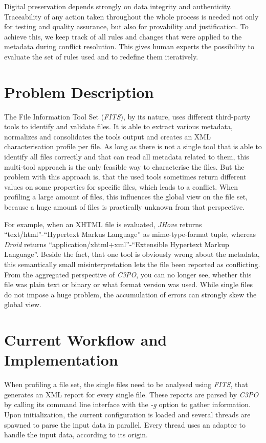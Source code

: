 \documentclass[a4paper,12pt]{article}
\begin{document}
Digital preservation depends strongly on data integrity and authenticity. Traceability of any action taken throughout the whole process is needed not only for testing and quality assurance, but also for provability and justification. To achieve this, we keep track of all rules and changes that were applied to the metadata during conflict resolution. This gives human experts the possibility to evaluate the set of rules used and to redefine them iteratively.


\section{Problem Description}

The File Information Tool Set (\emph{FITS}), by its nature, uses different third-party tools to identify and validate files. It is able to extract various metadata, normalizes and consolidates the tools output and creates an XML characterisation profile per file. As long as there is not a single tool that is able to identify all files correctly and that can read all metadata related to them, this multi-tool approach is the only feasible way to characterise the files. But the problem with this approach is, that the used tools sometimes return different values on some properties for specific files, which leads to a conflict. When profiling a large amount of files, this influences the global view on the file set, because a huge amount of files is practically unknown from that perspective.

For example, when an XHTML file is evaluated, \emph{JHove} returns ``text/html''-``Hypertext Markus Language'' as mime-type-format tuple, whereas \emph{Droid} returns ``application/xhtml+xml''-``Extensible Hypertext Markup Language''. Beside the fact, that one tool is obviously wrong about the metadata, this semantically small misinterpretation lets the file been reported as conflicting. From the aggregated perspective of \emph{C3PO}, you can no longer see, whether this file was plain text or binary or what format version was used. While single files do not impose a huge problem, the accumulation of errors can strongly skew the global view.


\section{Current Workflow and Implementation}
When profiling a file set, the single files need to be analysed using \emph{FITS}, that generates an XML report for every single file. These reports are parsed by \emph{C3PO} by calling its command line interface with the \emph{-g} option to gather information. Upon initialization, the current configuration is loaded and several threads are spawned to parse the input data in parallel. Every thread uses an adaptor to handle the input data, according to its origin.
\end{document}
